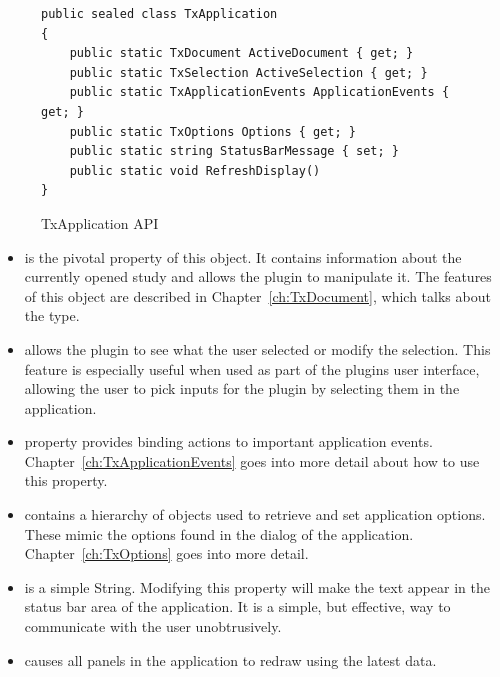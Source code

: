 \begin{figure}[H]
    \caption{TxApplication API}
    \centering
    \begin{verbatim}
public sealed class TxApplication
{
    public static TxDocument ActiveDocument { get; }
    public static TxSelection ActiveSelection { get; }
    public static TxApplicationEvents ApplicationEvents { get; }
    public static TxOptions Options { get; }
    public static string StatusBarMessage { set; }
    public static void RefreshDisplay()
}
    \end{verbatim}
    \label{fig:CodeTxApplication}
\end{figure}

\begin{itemize}

\item {} is the pivotal property of this object.
It contains information about the currently opened study and allows the plugin to manipulate it. The features of this object are described in Chapter~\ref{ch:TxDocument}, which talks about the  type.

\item {} allows the plugin to see what the user selected or modify the selection. This feature is especially useful when used as part of the plugins user interface, allowing the user to pick inputs for the plugin by selecting them in the application.

\item {} property provides binding actions to important application events. Chapter~\ref{ch:TxApplicationEvents} goes into more detail about how to use this property.

\item {} contains a hierarchy of objects used to retrieve and set application options. These mimic the options found in the  dialog of the application. Chapter~\ref{ch:TxOptions} goes into more detail.

\item {} is a simple String. Modifying this property will make the text appear in the status bar area of the application. It is a simple, but effective, way to communicate with the user unobtrusively.

\item {} causes all panels in the application to redraw using the latest data.

\end{itemize}

